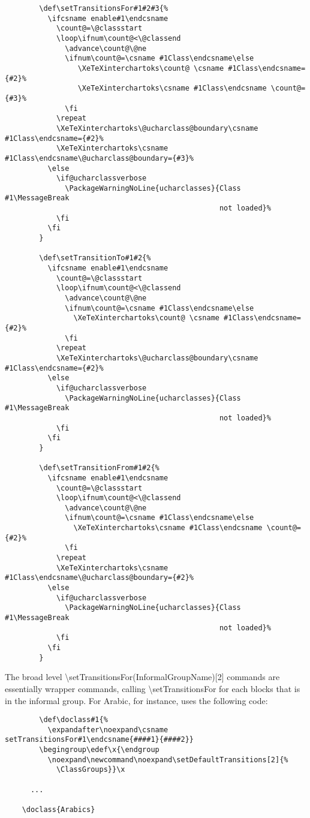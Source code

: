 ﻿\documentclass{article}
\begin{document}
		\disableTransitionRules
		\begin{verbatim}
		\def\setTransitionsFor#1#2#3{%
		  \ifcsname enable#1\endcsname
		    \count@=\@classstart
		    \loop\ifnum\count@<\@classend
		      \advance\count@\@ne
		      \ifnum\count@=\csname #1Class\endcsname\else
		         \XeTeXinterchartoks\count@ \csname #1Class\endcsname={#2}%
		         \XeTeXinterchartoks\csname #1Class\endcsname \count@={#3}%
		      \fi
		    \repeat
		    \XeTeXinterchartoks\@ucharclass@boundary\csname #1Class\endcsname={#2}%
		    \XeTeXinterchartoks\csname #1Class\endcsname\@ucharclass@boundary={#3}%
		  \else
		    \if@ucharclassverbose
		      \PackageWarningNoLine{ucharclasses}{Class #1\MessageBreak
		                                          not loaded}%
		    \fi
		  \fi
		}

		\def\setTransitionTo#1#2{%
		  \ifcsname enable#1\endcsname
		    \count@=\@classstart
		    \loop\ifnum\count@<\@classend
		      \advance\count@\@ne
		      \ifnum\count@=\csname #1Class\endcsname\else
		        \XeTeXinterchartoks\count@ \csname #1Class\endcsname={#2}%
		      \fi
		    \repeat
		    \XeTeXinterchartoks\@ucharclass@boundary\csname #1Class\endcsname={#2}%
		  \else
		    \if@ucharclassverbose
		      \PackageWarningNoLine{ucharclasses}{Class #1\MessageBreak
		                                          not loaded}%
		    \fi
		  \fi
		}

		\def\setTransitionFrom#1#2{%
		  \ifcsname enable#1\endcsname
		    \count@=\@classstart
		    \loop\ifnum\count@<\@classend
		      \advance\count@\@ne
		      \ifnum\count@=\csname #1Class\endcsname\else
		        \XeTeXinterchartoks\csname #1Class\endcsname \count@={#2}%
		      \fi
		    \repeat
		    \XeTeXinterchartoks\csname #1Class\endcsname\@ucharclass@boundary={#2}%
		  \else
		    \if@ucharclassverbose
		      \PackageWarningNoLine{ucharclasses}{Class #1\MessageBreak
		                                          not loaded}%
		    \fi
		  \fi
		}
		\end{verbatim}
		\enableTransitionRules

		The broad level \textbackslash setTransitionsFor(InformalGroupName)[2] commands are essentially wrapper commands, calling \textbackslash setTransitionsFor for each blocks that is in the informal group. For Arabic, for instance, uses the following code:

		\disableTransitionRules
		\begin{verbatim}
		\def\doclass#1{%
		  \expandafter\noexpand\csname setTransitionsFor#1\endcsname{####1}{####2}}
		\begingroup\edef\x{\endgroup
		  \noexpand\newcommand\noexpand\setDefaultTransitions[2]{%
		    \ClassGroups}}\x

	  ...

    \doclass{Arabics}
		\end{verbatim}
		\enableTransitionRules
\end{document}
